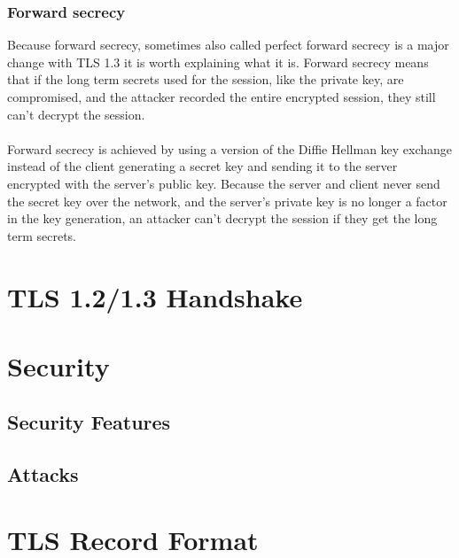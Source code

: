 \documentclass[11pt]{scrartcl} %
\begin{document}
\subsubsection{Forward secrecy}

Because forward secrecy, sometimes also called perfect forward secrecy is a major change with TLS 1.3 it is worth explaining what it is. Forward secrecy means that if the long term secrets used for the session, like the private key, are compromised, and the attacker recorded the entire encrypted session, they still can't decrypt the session.
\\\\
Forward secrecy is achieved by using a version of the Diffie Hellman key exchange instead of the client generating a secret key and sending it to the server encrypted with the server's public key. Because the server and client never send the secret key over the network, and the server's private key is no longer a factor in the key generation, an attacker can't decrypt the session if they get the long term secrets.



\section{TLS 1.2/1.3 Handshake}
\label{sec:tls_handshake}

\section{Security}

\subsection{Security Features}

\subsection{Attacks}

\section{TLS Record Format}
\end{document}

